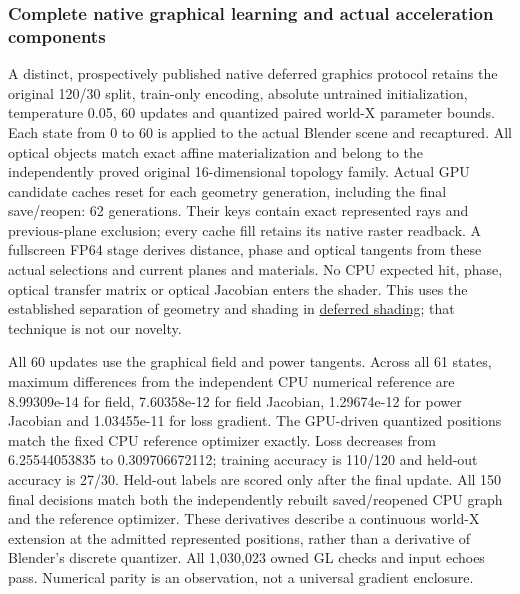 \documentclass[
  10pt,
]{article}
\begin{document}
\hypertarget{complete-native-graphical-learning-and-actual-acceleration-components}{%
\subsubsection{Complete native graphical learning and actual
acceleration
components}\label{complete-native-graphical-learning-and-actual-acceleration-components}}

A distinct, prospectively published native deferred graphics protocol
retains the original 120/30 split, train-only encoding, absolute
untrained initialization, temperature 0.05, 60 updates and quantized
paired world-X parameter bounds. Each state from 0 to 60 is applied to
the actual Blender scene and recaptured. All optical objects match exact
affine materialization and belong to the independently proved original
16-dimensional topology family. Actual GPU candidate caches reset for
each geometry generation, including the final save/reopen: 62
generations. Their keys contain exact represented rays and
previous-plane exclusion; every cache fill retains its native raster
readback. A fullscreen FP64 stage derives distance, phase and optical
tangents from these actual selections and current planes and materials.
No CPU expected hit, phase, optical transfer matrix or optical Jacobian
enters the shader. This uses the established separation of geometry and
shading in
\href{https://developer.nvidia.com/gpugems/gpugems2/part-ii-shading-lighting-and-shadows/chapter-9-deferred-shading-stalker}{deferred
shading}; that technique is not our novelty.

All 60 updates use the graphical field and power tangents. Across all 61
states, maximum differences from the independent CPU numerical reference
are 8.99309e-14 for field, 7.60358e-12 for field Jacobian, 1.29674e-12
for power Jacobian and 1.03455e-11 for loss gradient. The GPU-driven
quantized positions match the fixed CPU reference optimizer exactly.
Loss decreases from 6.25544053835 to 0.309706672112; training accuracy
is 110/120 and held-out accuracy is 27/30. Held-out labels are scored
only after the final update. All 150 final decisions match both the
independently rebuilt saved/reopened CPU graph and the reference
optimizer. These derivatives describe a continuous world-X extension at
the admitted represented positions, rather than a derivative of
Blender's discrete quantizer. All 1,030,023 owned GL checks and input
echoes pass. Numerical parity is an observation, not a universal
gradient enclosure.
\end{document}
